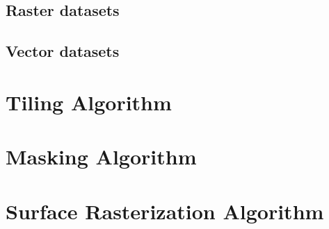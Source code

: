 \subsection{Raster datasets}


\subsection{Vector datasets}


\section{Tiling Algorithm}%
\label{sec:tiling-algorithm}


\section{Masking Algorithm}%
\label{sec:masking-algorithm}


\newpage
\section{Surface Rasterization Algorithm}%
\label{sec:surface-rasterization}

